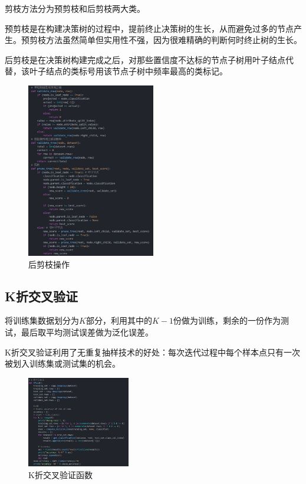 \documentclass{sdureport}
\begin{document}
\begin{sduDocument}
	剪枝方法分为预剪枝和后剪枝两大类。
	
	预剪枝是在构建决策树的过程中，提前终止决策树的生长，从而避免过多的节点产生。预剪枝方法虽然简单但实用性不强，因为很难精确的判断何时终止树的生长。
	
	后剪枝是在决策树构建完成之后，对那些置信度不达标的节点子树用叶子结点代替，该叶子结点的类标号用该节点子树中频率最高的类标记。

	\begin{figure}[H]
		\begin{center}
		\includegraphics[width=0.5\textwidth]{image/5.7.4.jpg}
		\end{center}
		\caption{后剪枝操作}
	\end{figure}

	\subsection{K折交叉验证}

	将训练集数据划分为$K$部分，利用其中的$K-1$份做为训练，剩余的一份作为测试，最后取平均测试误差做为泛化误差。

	K折交叉验证利用了无重复抽样技术的好处：每次迭代过程中每个样本点只有一次被划入训练集或测试集的机会。

	\begin{figure}[H]
		\begin{center}
		\includegraphics[width=0.4\textwidth]{image/5.7.5.jpg}
		\end{center}
		\caption{K折交叉验证函数}
	\end{figure}


\end{sduDocument}
\end{document}
